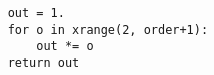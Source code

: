 \documentclass{article}
\begin{document}
\begin{verbatim}
    out = 1.
    for o in xrange(2, order+1):
        out *= o
    return out\end{verbatim}
\end{document}
